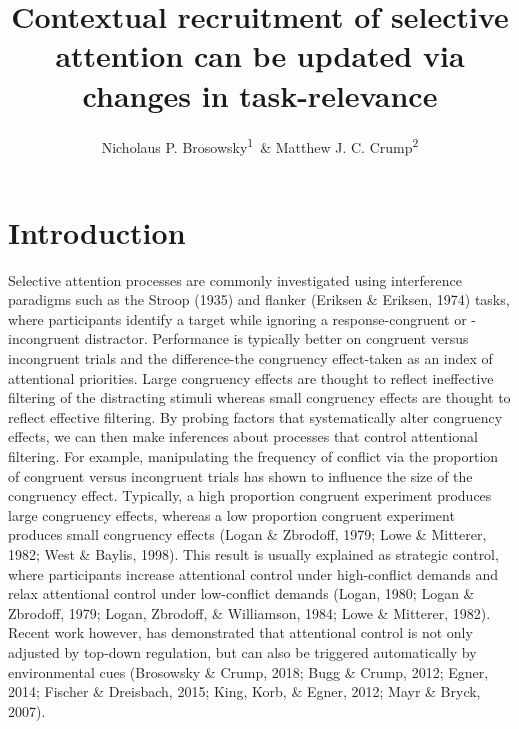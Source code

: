 \documentclass[english,,man,floatsintext]{apa6}
\title{Contextual recruitment of selective attention can be updated via changes in task-relevance}
\author{Nicholaus P. Brosowsky\textsuperscript{1}~\& Matthew J. C. Crump\textsuperscript{2}}
\date{}
\affiliation{
\vspace{0.5cm}
\textsuperscript{1} The Graduate Center of the City University of New York\\\textsuperscript{2} Brooklyn College of the City University of New York}
\begin{document}
\maketitle

\hypertarget{introduction}{%
\section{Introduction}\label{introduction}}

Selective attention processes are commonly investigated using interference paradigms such as the Stroop (1935) and flanker (Eriksen \& Eriksen, 1974) tasks, where participants identify a target while ignoring a response-congruent or -incongruent distractor. Performance is typically better on congruent versus incongruent trials and the difference-the congruency effect-taken as an index of attentional priorities. Large congruency effects are thought to reflect ineffective filtering of the distracting stimuli whereas small congruency effects are thought to reflect effective filtering. By probing factors that systematically alter congruency effects, we can then make inferences about processes that control attentional filtering. For example, manipulating the frequency of conflict via the proportion of congruent versus incongruent trials has shown to influence the size of the congruency effect. Typically, a high proportion congruent experiment produces large congruency effects, whereas a low proportion congruent experiment produces small congruency effects (Logan \& Zbrodoff, 1979; Lowe \& Mitterer, 1982; West \& Baylis, 1998). This result is usually explained as strategic control, where participants increase attentional control under high-conflict demands and relax attentional control under low-conflict demands (Logan, 1980; Logan \& Zbrodoff, 1979; Logan, Zbrodoff, \& Williamson, 1984; Lowe \& Mitterer, 1982). Recent work however, has demonstrated that attentional control is not only adjusted by top-down regulation, but can also be triggered automatically by environmental cues (Brosowsky \& Crump, 2018; Bugg \& Crump, 2012; Egner, 2014; Fischer \& Dreisbach, 2015; King, Korb, \& Egner, 2012; Mayr \& Bryck, 2007).
\end{document}
